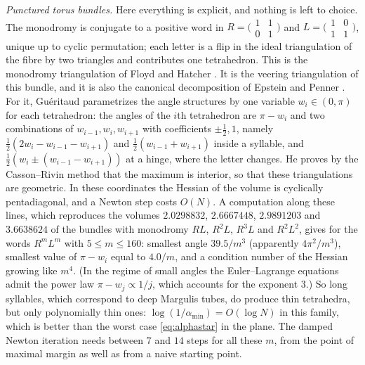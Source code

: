 \documentclass[11pt]{amsart}
\theoremstyle{definition}
\theoremstyle{remark}
\begin{document}
\emph{Punctured torus bundles.} Here everything is explicit, and nothing is left to choice. The monodromy is conjugate to a positive word in $R=\bigl(\begin{smallmatrix}1&1\\0&1\end{smallmatrix}\bigr)$ and $L=\bigl(\begin{smallmatrix}1&0\\1&1\end{smallmatrix}\bigr)$, unique up to cyclic permutation; each letter is a flip in the ideal triangulation of the fibre by two triangles and contributes one tetrahedron.
This is the monodromy triangulation of Floyd and Hatcher \cite{FH82}. It is the veering triangulation of this bundle, and it is also the canonical decomposition of Epstein and Penner \cite{Lac03}. For it, Gu\'eritaud \cite{Gue06} parametrizes the angle structures by one variable $w_i\in(0,\pi)$ for each tetrahedron: the angles of the $i$th tetrahedron are $\pi-w_i$ and two combinations of $w_{i-1},w_i,w_{i+1}$ with coefficients $\pm\frac12,1$,
namely $\frac12(2w_i-w_{i-1}-w_{i+1})$ and $\frac12(w_{i-1}+w_{i+1})$ inside a syllable, and $\frac12(w_i\pm(w_{i-1}-w_{i+1}))$ at a hinge, where the letter changes. He proves by the Casson--Rivin method that the maximum is interior, so that these triangulations are geometric.
In these coordinates the Hessian of the volume is cyclically pentadiagonal, and a Newton step costs $O(N)$. A computation along these lines, which reproduces the volumes $2.0298832$, $2.6667448$, $2.9891203$ and $3.6638624$ of the bundles with monodromy $RL$, $R^2L$, $R^3L$ and $R^2L^2$, gives for the words $R^mL^m$ with $5\le m\le160$:
smallest angle $39.5/m^3$ (apparently $4\pi^2/m^3$), smallest value of $\pi-w_i$ equal to $4.0/m$, and a condition number of the Hessian growing like $m^4$. (In the regime of small angles the Euler--Lagrange equations admit the power law $\pi-w_j\propto1/j$, which accounts for the exponent $3$.)
So long syllables, which correspond to deep Margulis tubes, do produce thin tetrahedra, but only polynomially thin ones: $\log(1/\alpha_{\min})=O(\log N)$ in this family, which is better than the worst case \eqref{eq:alphastar} in the plane.
The damped Newton iteration needs between $7$ and $14$ steps for all these $m$, from the point of maximal margin as well as from a naive starting point.
\end{document}
